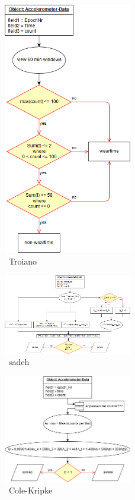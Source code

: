 \begin{appendix}
\begin{figure}
  \centering
      \includegraphics[width=0.5\textwidth]{Bilder/Troiano.png}
    \caption{\ Troiano}
    \label{flow:troiano}
\end{figure}

\begin{figure}
  \centering
      \includegraphics[width=0.5\textwidth]{Bilder/slp_sadeh.png}
    \caption{\ sadeh}
    \label{flow:sadeh}
\end{figure}

\begin{figure}
  \centering
      \includegraphics[width=0.5\textwidth]{Bilder/cole-kripke.png}
    \caption{\ Cole-Kripke}
    \label{flow:cole}
\end{figure}


\end{appendix}
